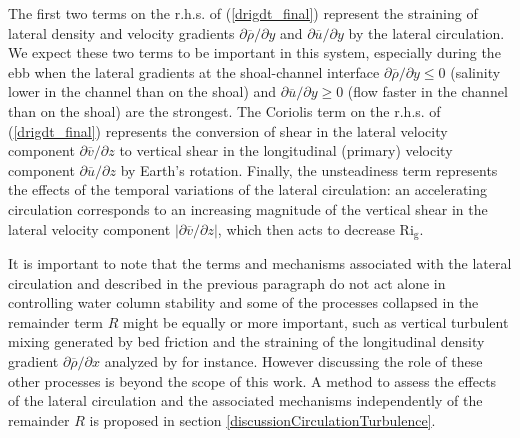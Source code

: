 The first two terms on the r.h.s. of (\ref{drigdt_final}) represent the straining of lateral density and velocity gradients $\partial \overline{\rho} / \partial y$ and $\partial \overline{u} / \partial y$ by the lateral circulation. We expect these two terms to be important in this system, especially during the ebb when the lateral gradients at the shoal-channel interface $\partial \overline{\rho} / \partial y \leq 0$ (salinity lower in the channel than on the shoal) and $\partial \overline{u} / \partial y \geq 0$ (flow faster in the channel than on the shoal) are the strongest. The Coriolis term on the r.h.s. of (\ref{drigdt_final}) represents the conversion of shear in the lateral velocity component $\partial \overline{v} / \partial z$ to vertical shear in the longitudinal (primary) velocity component  $\partial \overline{u} / \partial z$ by Earth's rotation. Finally, the unsteadiness term represents the effects of the temporal variations of the lateral circulation: an accelerating circulation corresponds to an increasing magnitude of the vertical shear in the lateral velocity component $\left| \partial \overline{v} / \partial z \right|$, which then acts to decrease $\mathrm{Ri_g}$.

It is important to note that the terms and mechanisms associated with the lateral circulation and described in the previous paragraph do not act alone in controlling water column stability and some of the processes collapsed in the remainder term $R$ might be equally or more important, such as vertical turbulent mixing generated by bed friction and the straining of the longitudinal density gradient $\partial \overline{\rho} / \partial x$ analyzed by \textcite{SIMPSON:1990p5698} for instance. However discussing the role of these other processes is beyond the scope of this work. A method to assess the effects of the lateral circulation and the associated mechanisms independently of the remainder $R$ is proposed in section \ref{discussionCirculationTurbulence}.


